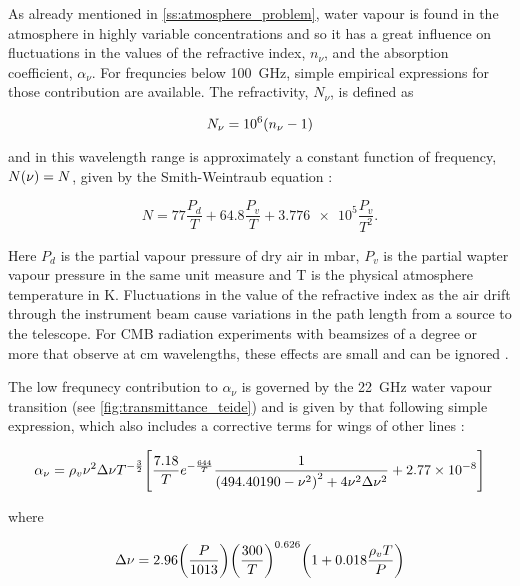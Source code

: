 As already mentioned in \autoref{ss:atmosphere_problem}, water
vapour is found in the atmosphere in highly variable concentrations and so
it has a great influence on fluctuations in the values of the refractive
index, $n_\nu$, and the absorption coefficient, $\alpha_\nu$. For frequncies
below \SI{100}{\giga\hertz}, simple empirical expressions for those
contribution are available. The refractivity, $N_\nu$, is defined as

\begin{equation}
        N_\nu = \num{e6}\qty(n_\nu - 1)
\end{equation}

and in this wavelength range is approximately a constant function of
frequency, $N\qty(\nu) = N$, given by the Smith-Weintraub equation
\autocite{smith1953constants}:

\begin{equation}
        N = 77\frac{P_d}{T} + 64.8\frac{P_v}{T} +
        \num{3.776e5}\frac{P_v}{T^2}.
\end{equation}

Here $P_d$ is the partial vapour pressure of dry air in
\si{\milli\bar}, $P_v$ is the partial wapter vapour pressure in the same
unit measure and T is the physical atmosphere temperature in \si{\kelvin}.
Fluctuations in the value of the refractive index as the air drift through
the instrument beam cause variations in the path length from a source to
the telescope. For CMB radiation experiments with beamsizes of a degree or
more that observe at \si{\centi\meter} wavelengths, these effects are small
and can be ignored \autocite{church1995predicting}.

The low frequnecy contribution to $\alpha_\nu$ is governed by the
\SI{22}{\giga\hertz} water vapour transition (see
\autoref{fig:transmittance_teide}) and is given by that following simple
expression, which also includes a corrective terms for wings of other
lines \autocite{waters19762}:

\begin{equation}
        \alpha_\nu = \rho_v\nu^2\Delta \nu T^{-\frac{3}{2}}
        \qty[\frac{7.18}{T} e^{-\frac{644}{T}}
        \frac{1}{\qty(494.40190 - \nu^2)^2 + 4\nu^2\Delta \nu^2}
        + \num{2.77e-8}]
\end{equation}

where

\begin{equation}
        \Delta \nu = 2.96\qty(\frac{P}{1013})\qty(\frac{300}{T})^{0.626}
        \qty(1 + 0.018\frac{\rho_v T}{P})
\end{equation}


